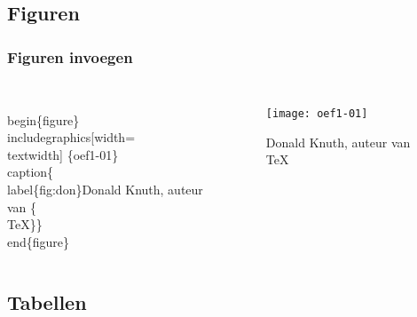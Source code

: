 \documentclass[aspectratio=169]{beamer}
\begin{document}
\subsection{Figuren}

\begin{frame}
 \frametitle{Figuren invoegen}

 \begin{columns}[c]

\begin{semiverbatim}
\alert<1>{\\begin\{figure\}}
\alert<2>{\\includegraphics[width=\\textwidth]
 \{oef1-01\}}
\alert<3>{\\caption\{\alert<4>{\\label\{fig:don\}}Donald Knuth, auteur van
 \{\\TeX\}\}}
\alert<1>{\\end\{figure\}}
\end{semiverbatim}

   \begin{figure}
     \texttt{[image: oef1-01]}
     \caption{\label{fig:don}Donald Knuth, auteur van {\TeX}}
   \end{figure}

 \end{columns}

\end{frame}

\subsection{Tabellen}
\end{document}
